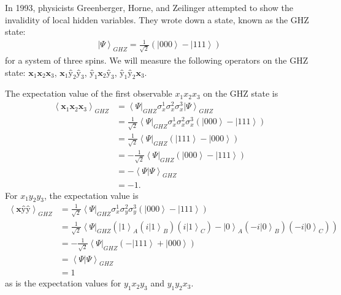 \documentclass[11pt]{article} %
\newcommand{\bra}[1]{\left\langle #1 \right|}
\newcommand{\ket}[1]{\left|#1\right\rangle}
\newcommand{\braket}[2]{\left\langle#1 |  #2\right\rangle}
\begin{document}
In 1993, physicists Greenberger, Horne, and Zeilinger attempted to show the invalidity of local hidden variables. They wrote down a state, known as the GHZ state:
\begin{align}
    \ket{\Psi}_{GHZ} = \frac{1}{\sqrt{2}}\left(\ket{000} - \ket{111}\right)
\end{align}
for a system of three spins. We will measure the following operators on the GHZ state: $\textbf{\^x}_1\textbf{\^x}_2\textbf{\^x}_3$, $\textbf{\^x}_1\textbf{\^y}_2\textbf{\^y}_3$, $\textbf{\^y}_1\textbf{\^x}_2\textbf{\^y}_3$, $\textbf{\^y}_1\textbf{\^y}_2\textbf{\^x}_3$.

The expectation value of the first observable $x_1x_2x_3$ on the GHZ state is
\begin{align}
    \left<\textbf{\^x}_1\textbf{\^x}_2\textbf{\^x}_3\right>_{GHZ} &= \bra{\Psi}_{GHZ}\sigma^1_x\sigma^2_x\sigma^3_x\ket{\Psi}_{GHZ}\\
    &= \frac{1}{\sqrt{2}}\bra{\Psi}_{GHZ}\sigma^1_x\sigma^2_x\sigma^3_x\left(\ket{000} - \ket{111}\right)\nonumber\\
    &= \frac{1}{\sqrt{2}}\bra{\Psi}_{GHZ}\left(\ket{111} - \ket{000}\right)\nonumber\\
    &= -\frac{1}{\sqrt{2}}\bra{\Psi}_{GHZ}\left(\ket{000} - \ket{111}\right)\nonumber\\
    &= -\braket{\Psi}{\Psi}_{GHZ}\nonumber\\
    &= -1.
\end{align}
For $x_1y_2y_3$, the expectation value is
\begin{align}
    \left<\textbf{\^x}\textbf{\^y}\textbf{\^y}\right>_{GHZ} &= \frac{1}{\sqrt{2}}\bra{\Psi}_{GHZ}\sigma^1_x\sigma^2_y\sigma^3_y\left(\ket{000} - \ket{111}\right)\nonumber\\
    &= \frac{1}{\sqrt{2}}\bra{\Psi}_{GHZ}\left(\ket{1}_A\left(i\ket{1}_B\right)\left(i\ket{1}_C\right) - \ket{0}_A\left(-i\ket{0}_B\right)\left(-i\ket{0}_C\right)\right)\nonumber\\
    &= -\frac{1}{\sqrt{2}}\bra{\Psi}_{GHZ}\left(-\ket{111} + \ket{000}\right)\nonumber\\
    &= \braket{\Psi}{\Psi}_{GHZ}\nonumber\\
    &= 1
\end{align}
as is the expectation values for $y_1x_2y_3$ and $y_1y_2x_3$.
\end{document}
